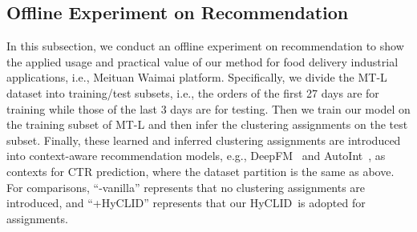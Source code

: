 \documentclass[11pt]{article}
\def\modelname{HyCLID}
\begin{document}


% 



\subsection{Offline Experiment on Recommendation}

In this subsection, we conduct an offline experiment on recommendation to show the applied usage and practical value of our method for food delivery industrial applications, i.e., Meituan Waimai platform. %
%
Specifically, we divide the MT-L dataset into training/test subsets, i.e., the orders of the first 27 days are for training while those of the last 3 days are for testing. Then we train our model on the training subset of MT-L and then infer the clustering assignments on the test subset. Finally, these learned and inferred clustering assignments are introduced into context-aware recommendation models, e.g., DeepFM~\cite{guo_deepfm_2017} and AutoInt~\cite{song_autoint_2019}, as contexts for CTR prediction, where the dataset partition is the same as above. For comparisons, ``-vanilla'' represents that no clustering assignments are introduced,
and ``+\modelname'' represents that our \modelname~is adopted for assignments.
\end{document}
